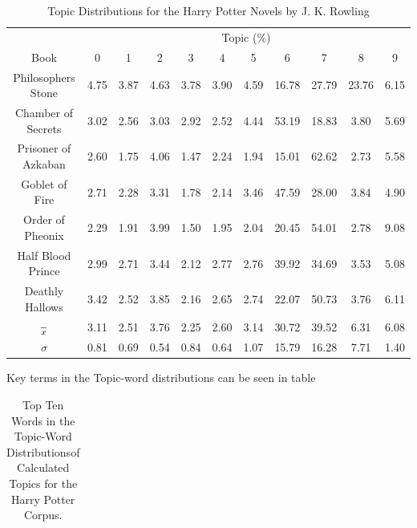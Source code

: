 \documentclass[10pt]{report}
\begin{document}
\renewcommand{\baselinestretch}{1.0}\normalsize
\renewcommand{\arraystretch}{1.2}
\begin{table}[h!]
  \centering
  \begin{tabular}{c || c | c | c | c | c | c | c | c | c | c }
    &     \multicolumn{10}{c}{Topic (\%)}\\
    Book & 0 & 1 & 2 & 3 & 4 & 5 & 6 & 7 & 8 & 9 \\
    \hline
    Philosophers Stone  & 4.75 & 3.87 & 4.63 & 3.78 & 3.90 & 4.59 & 16.78 & 27.79 & 23.76 & 6.15 \\
    Chamber of Secrets  & 3.02 & 2.56 & 3.03 & 2.92 & 2.52 & 4.44 & 53.19 & 18.83 & 3.80 & 5.69 \\
    Prisoner of Azkaban & 2.60 & 1.75 & 4.06 & 1.47 & 2.24 & 1.94 & 15.01 & 62.62 & 2.73 & 5.58 \\
    Goblet of Fire      & 2.71 & 2.28 & 3.31 & 1.78 & 2.14 & 3.46 & 47.59 & 28.00 & 3.84 & 4.90 \\
    Order of Pheonix    & 2.29 & 1.91 & 3.99 & 1.50 & 1.95 & 2.04 & 20.45 & 54.01 & 2.78 & 9.08 \\
    Half Blood Prince   & 2.99 & 2.71 & 3.44 & 2.12 & 2.77 & 2.76 & 39.92 & 34.69 & 3.53 & 5.08 \\
    Deathly Hallows     & 3.42 & 2.52 & 3.85 & 2.16 & 2.65 & 2.74 & 22.07 & 50.73 & 3.76 & 6.11 \\
    \hline\hline
    $\over{x}$ & 3.11 & 2.51 & 3.76 & 2.25 & 2.60 & 3.14 & 30.72 & 39.52 & 6.31 & 6.08 \\
    $\sigma$ & 0.81 & 0.69 & 0.54 & 0.84 & 0.64 & 1.07 & 15.79 & 16.28 & 7.71 & 1.40 \\
  \end{tabular}
  \caption{Topic Distributions for the Harry Potter Novels by J. K. Rowling \label{tab:hp_topics}}
\end{table}
\renewcommand{\baselinestretch}{2.0}\normalsize
\renewcommand{\arraystretch}{1.0}

Key terms in the Topic-word distributions can be seen in table
\begin{table}
  \begin{tabular}{c | c c c c c c c c c c}

  \end{tabular}
  \caption{Top Ten Words in the Topic-Word Distributionsof Calculated Topics for the Harry Potter Corpus.\label{tab:hp_topics_terms}}
\end{table}
\end{document}

